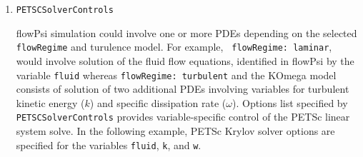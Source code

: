 \documentclass{article}
\begin{document}
\begin{enumerate}
\begin{verbatim}
LSGSSolverControls: <
fluid=options(MaxIter=10,RelTol=0.1,AbsTol=1e-5,Relaxation=0.33),
k=options(MaxIter=10,RelTol=0.05,DiagnosticLevel=1),
w=options(MaxIter=100,RelTol=0.01,DiagnosticLevel=1)
>
\end{verbatim}

Note that for the Spalart Allmaras turbulence model, the equation solver is {\tt nuTilde}.


\item {\tt PETSCSolverControls}

  flowPsi simulation could involve one or more PDEs depending on the
  selected {\tt flowRegime} and turulence model. For example, {\tt
    flowRegime: laminar}, would involve solution of the fluid flow
  equations, identified in flowPsi by the variable {\tt fluid} whereas
  {\tt flowRegime: turbulent} and the KOmega model consists of
  solution of two additional PDEs involving variables for turbulent
  kinetic energy ($k$) and specific dissipation rate
  ($\omega$). Options list specified by {\tt PETSCSolverControls}
  provides variable-specific control of the PETSc linear system
  solve. In the following example, PETSc Krylov solver options are
  specified for the variables {\tt fluid}, {\tt k}, and {\tt w}.


\end{enumerate}
\end{document}
